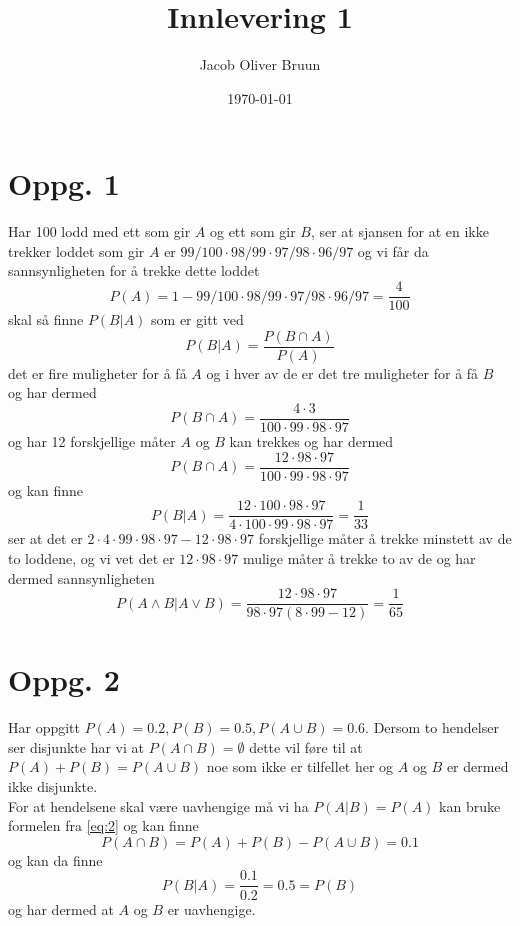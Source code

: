 \documentclass{report}
\title{Innlevering 1}
\author{Jacob Oliver Bruun}
\date{\today}
\begin{document}
\section*{Oppg. 1}
Har 100 lodd med ett som gir $A$ og ett som gir $B$, ser at sjansen for at en ikke trekker loddet som gir $A$ er $99/100 \cdot 98/99 \cdot 97/98 \cdot 96/97$ og vi får da sannsynligheten for å trekke dette loddet
\begin{equation}
  \label{eq:1}
  P(A) = 1 - 99/100 \cdot 98/99 \cdot 97/98 \cdot 96/97 = \frac{4}{100}
\end{equation}
skal så finne $P(B|A)$ som er gitt ved
\begin{equation}
  \label{eq:2}
  P(B|A) = \frac{P(B \cap A)}{P(A)}
\end{equation}
det er fire muligheter for å få $A$ og i hver av de er det tre muligheter for å få $B$ og har dermed
\begin{equation}
  \label{eq:3}
  P(B\cap A) = \frac{4\cdot 3}{100\cdot 99\cdot 98\cdot 97}
\end{equation}
og har 12 forskjellige måter $A$ og $B$ kan trekkes og har dermed
\begin{equation}
  \label{eq:4}
  P(B\cap A) = \frac{12\cdot 98\cdot 97}{100\cdot 99\cdot 98\cdot 97}
\end{equation}
og kan finne
\begin{equation}
  \label{eq:5}
  P(B|A) = \frac{12\cdot 100\cdot 98\cdot 97}{4 \cdot 100\cdot 99\cdot 98\cdot 97} = \frac{1}{33}
\end{equation}
ser at det er $2\cdot 4\cdot 99\cdot 98\cdot 97 - 12\cdot 98\cdot 97$ forskjellige måter å trekke minstett av de to loddene, og vi vet det er $12\cdot 98\cdot 97$ mulige måter å trekke to av de og har dermed sannsynligheten
\begin{equation}
  \label{eq:11}
  P(A\land B | A\lor B) = \frac{12\cdot 98\cdot 97}{98\cdot 97 (8\cdot 99 - 12)} = \frac{1}{65}
\end{equation}


\section*{Oppg. 2}
Har oppgitt $P(A) = 0.2, P(B) = 0.5, P(A\cup B) = 0.6$. Dersom to hendelser ser disjunkte har vi at $P(A\cap B) = \emptyset$ dette vil føre til at $P(A) + P(B) = P(A\cup B)$ noe som ikke er tilfellet her og $A$ og $B$ er dermed ikke disjunkte. \\
For at hendelsene skal være uavhengige må vi ha $P(A|B) = P(A)$ kan bruke formelen fra \eqref{eq:2} og kan finne
\begin{equation}
  \label{eq:6}
  P(A\cap B) = P(A) + P(B) - P(A\cup B) = 0.1
\end{equation}
og kan da finne
\begin{equation}
  \label{eq:7}
  P(B|A) = \frac{0.1}{0.2} = 0.5 = P(B)
\end{equation}
og har dermed at $A$ og $B$ er uavhengige.
\end{document}
